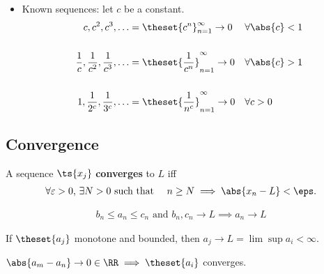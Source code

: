 \begin{itemize}
\tightlist
\item
  Known sequences: let \(c\) be a constant.
  \begin{align*}
  c, c^2, c^3, \ldots 
  &= \theset{c^n}_{n=1}^\infty \to 0 
  && \forall \abs{c} < 1 \\ \\ 
  \frac{1}{c},\frac{1}{c^2},\frac{1}{c^3},\ldots 
  &= \theset{\frac{1}{c^n}}_{n=1}^\infty \to 0 
  &&\forall  \abs{c} > 1 \\ \\
  1,\frac{1}{2^c},\frac{1}{3^c},\ldots 
  &= \theset{\frac{1}{n^c}}_{n=1}^\infty \to 0 
  && \forall c > 0
  \end{align*}
\end{itemize}

\hypertarget{convergence}{%
\subsection{Convergence}\label{convergence}}

\begin{definition}

A sequence \(\ts{x_j}\) \textbf{converges} to \(L\) iff
\begin{align*}  
\forall \varepsilon > 0,\, \exists N > 0 \text{ such that } \quad n\geq N \implies \abs{x_n - L} < \eps
.\end{align*}

\end{definition}

\begin{theorem}

\begin{align*}
b_n \leq a_n \leq c_n \text{ and } b_n,c_n \to L \implies a_n \to L
\end{align*}

\end{theorem}

\begin{theorem}

If \(\theset{a_j}\) monotone and bounded, then
\(a_j \to L = \lim\sup a_i < \infty\).

\end{theorem}

\begin{theorem}

\(\abs{a_m - a_n} \to 0 \in \RR \implies \theset{a_i}\) converges.

\end{theorem}

